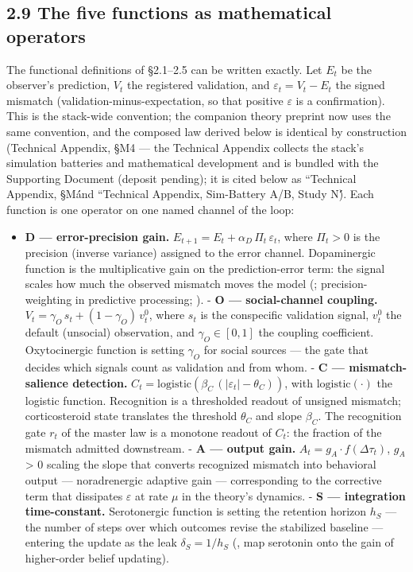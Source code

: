 \documentclass[
]{article}
\providecommand{\tightlist}{%
  \setlength{\itemsep}{0pt}\setlength{\parskip}{0pt}}
\begin{document}
\subsection{2.9 The five functions as mathematical
operators}\label{the-five-functions-as-mathematical-operators}

The functional definitions of §2.1--2.5 can be written exactly. Let
\(E_{t}\) be the observer's prediction, \(V_{t}\) the registered
validation, and \(\varepsilon_t = V_t - E_t\) the signed mismatch
(validation-minus-expectation, so that positive \(\varepsilon\) is a
confirmation). This is the stack-wide convention; the companion theory
preprint now uses the same convention, and the composed law derived
below is identical by construction (Technical Appendix, §M4 --- the
Technical Appendix collects the stack's simulation batteries and
mathematical development and is bundled with the Supporting Document
(deposit pending); it is cited below as ``Technical Appendix, §Má́nd
``Technical Appendix, Sim-Battery A/B, Study N)́́. Each function is one
operator on one named channel of the loop:

\begin{itemize}
\tightlist
\item
  \textbf{D --- error-precision gain.}
  \(E_{t+1} = E_t + \alpha_D\,\Pi_t\,\varepsilon_t\), where
  \(\Pi_t > 0\) is the precision (inverse variance) assigned to the
  error channel. Dopaminergic function is the multiplicative gain on the
  prediction-error term: the signal scales how much the observed
  mismatch moves the model (; precision-weighting in predictive
  processing; ). - \textbf{O --- social-channel coupling.}
  \(V_t = \gamma_O\,s_t + (1-\gamma_O)\,v_t^{0}\), where \(s_{t}\) is
  the conspecific validation signal, \(v_{t}^{{0}}\) the default
  (unsocial) observation, and \(\gamma_O \in [0,1]\) the coupling
  coefficient. Oxytocinergic function is setting \(\gamma_O\) for social
  sources --- the gate that decides which signals count as validation
  and from whom. - \textbf{C --- mismatch-salience detection.}
  \(C_t = \mathrm{logistic}\!\left(\beta_C\,\left(|\varepsilon_t| - \theta_C\right)\right)\),
  with \(\mathrm{logistic}(\cdot)\) the logistic function. Recognition
  is a thresholded readout of unsigned mismatch; corticosteroid state
  translates the threshold \(\theta_C\) and slope \(\beta_C\). The
  recognition gate \(r_t\) of the master law is a monotone readout of
  \(C_{t}\): the fraction of the mismatch admitted downstream. -
  \textbf{A --- output gain.} \(A_t = g_A \cdot f(\Delta\tau_t)\),
  \(g_{A}\) \textgreater{} 0 scaling the slope that converts recognized
  mismatch into behavioral output --- noradrenergic adaptive gain ---
  corresponding to the corrective term that dissipates \(\varepsilon\)
  at rate \(\mu\) in the theory's dynamics. - \textbf{S --- integration
  time-constant.} Serotonergic function is setting the retention horizon
  \(h_{S}\) --- the number of steps over which outcomes revise the
  stabilized baseline --- entering the update as the leak
  \(\delta_S = 1/h_S\) (, map serotonin onto the gain of higher-order
  belief updating).
\end{itemize}
\end{document}
